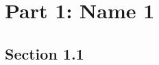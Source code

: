 \documentclass[module]{subfiles}
\begin{document}
\selectfont
\clearpage

\chapter{Part 1: Name 1}

\section{Section 1.1}
\lipsum[1]
\end{document}
